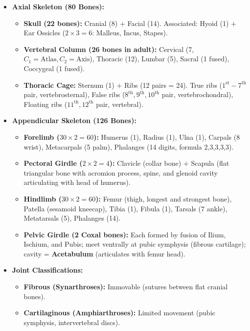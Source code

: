 \documentclass[10pt,twoside,openright]{book}
\begin{document}
\begin{conceptbox}
\begin{itemize}[leftmargin=*]
  \item \textbf{Axial Skeleton (80 Bones):}
  \begin{itemize}
    \item \textbf{Skull (22 bones):} Cranial (8) $+$ Facial (14). Associated: Hyoid (1) $+$ Ear Ossicles ($2 \times 3 = 6$: Malleus, Incus, Stapes).
    \item \textbf{Vertebral Column (26 bones in adult):} Cervical (7, $C_1=\text{Atlas}, C_2=\text{Axis}$), Thoracic (12), Lumbar (5), Sacral (1 fused), Coccygeal (1 fused).
    \item \textbf{Thoracic Cage:} Sternum (1) $+$ Ribs (12 pairs = 24). True ribs ($1^{\mathrm{st}}-7^{\mathrm{th}}$ pair, vertebrosternal), False ribs ($8^{\mathrm{th}}, 9^{\mathrm{th}}, 10^{\mathrm{th}}$ pair, vertebrochondral), Floating ribs ($11^{\mathrm{th}}, 12^{\mathrm{th}}$ pair, vertebral).
  \end{itemize}
  \item \textbf{Appendicular Skeleton (126 Bones):}
  \begin{itemize}
    \item \textbf{Forelimb ($30 \times 2 = 60$):} Humerus (1), Radius (1), Ulna (1), Carpals (8 wrist), Metacarpals (5 palm), Phalanges (14 digits, formula 2,3,3,3,3).
    \item \textbf{Pectoral Girdle ($2 \times 2 = 4$):} Clavicle (collar bone) $+$ Scapula (flat triangular bone with acromion process, spine, and glenoid cavity articulating with head of humerus).
    \item \textbf{Hindlimb ($30 \times 2 = 60$):} Femur (thigh, longest and strongest bone), Patella (sesamoid kneecap), Tibia (1), Fibula (1), Tarsals (7 ankle), Metatarsals (5), Phalanges (14).
    \item \textbf{Pelvic Girdle (2 Coxal bones):} Each formed by fusion of Ilium, Ischium, and Pubis; meet ventrally at pubic symphysis (fibrous cartilage); cavity = \textbf{Acetabulum} (articulates with femur head).
  \end{itemize}
  \item \textbf{Joint Classifications:}
  \begin{itemize}
    \item \textbf{Fibrous (Synarthroses):} Immovable (sutures between flat cranial bones).
    \item \textbf{Cartilaginous (Amphiarthroses):} Limited movement (pubic symphysis, intervertebral discs).

\end{itemize}
\end{itemize}
\end{conceptbox}
\end{document}
